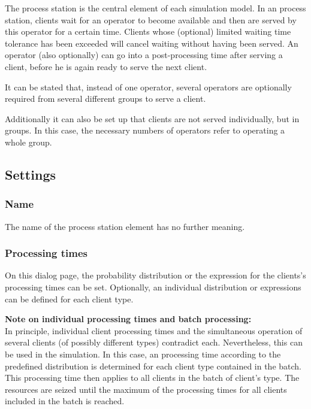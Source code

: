 The process station is the central element of each simulation model. In an process station, clients wait for an operator
to become available and then are served by this operator for a certain time. Clients whose (optional) limited waiting time
tolerance has been exceeded will cancel waiting without having been served. An operator (also optionally) can go into
a post-processing time after serving a client, before he is again ready to serve the next client.

It can be stated that, instead of one operator, several operators are optionally required from several different groups
to serve a client.

Additionally it can also be set up that clients are not served individually, but in groups.
In this case, the necessary numbers of operators refer to operating a whole group.

\subsection*{Settings}

\subsubsection*{Name}

The name of the process station element has no further meaning.

\subsubsection*{Processing times}

On this dialog page, the probability distribution or the expression for the clients's processing times can be set.
Optionally, an individual distribution or expressions can be defined for each client type.

\textbf{Note on individual processing times and batch processing:}~\\
In principle, individual client processing times and the simultaneous operation of several clients
(of possibly different types) contradict each. Nevertheless, this can be used in the simulation.
In this case, an processing time according to the predefined distribution is determined for each
client type contained in the batch. This processing time then applies to all clients in the batch
of client's type. The resources are seized until the maximum of the processing times for all
clients included in the batch is reached.

